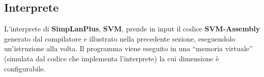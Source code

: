 \documentclass[../../main]{subfiles}
\begin{document}
\subsection{Interprete}
L'interprete di \textbf{SimpLanPlus}, \textbf{SVM}, prende in input il codice \textbf{SVM-Assembly} generato dal compilatore e illustrato nella precedente sezione, eseguendolo un'istruzione alla volta.
Il programma viene eseguito in una ``memoria virtuale'' (simulata dal codice che implementa l'interprete) la cui dimensione è configurabile.
\end{document}
